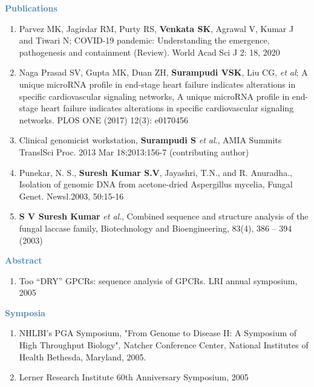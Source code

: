 \documentclass[12pt]{article}
\begin{document}
\noindent\textbf{\textcolor{steelblue}{Publications}}\\[-20pt]

\begin{enumerate}
	\item Parvez MK, Jagirdar RM, Purty RS, \textbf{Venkata SK}, Agrawal V, Kumar J and Tiwari N; COVID-19 pandemic: Understanding the emergence, pathogenesis and containment (Review). World Acad Sci J 2: 18, 2020
	\item Naga Prasad SV, Gupta MK, Duan ZH, \textbf{Surampudi VSK}, Liu CG, \textit{et al}; A unique microRNA profile in end-stage heart failure indicates alterations in specific cardiovascular signaling networks, A unique microRNA profile in end-stage heart failure indicates alterations in specific cardiovascular signaling networks. PLOS ONE (2017) 12(3): e0170456
	\item Clinical genomicist workstation, \textbf{Surampudi S} \textit{et al}., AMIA Summits TranslSci Proc. 2013 Mar 18;2013:156-7 (contributing author)
	\item Punekar, N. S., \textbf{Suresh Kumar S.V}, Jayashri, T.N., and R. Anuradha., Isolation of genomic DNA from acetone-dried Aspergillus mycelia, Fungal Genet. Newsl.2003, 50:15-16
	\item \textbf{S V Suresh Kumar} \textit{et al}., Combined sequence and structure analysis of the fungal laccase family, Biotechnology and Bioengineering, 83(4), 386 – 394 (2003)
\end{enumerate}

\noindent\textbf{\textcolor{steelblue}{Abstract}}\\[-20pt]

\begin{enumerate}
	\item Too “DRY” GPCRs: sequence analysis of GPCRs. LRI annual symposium, 2005
\end{enumerate}

\noindent\textbf{\textcolor{steelblue}{Symposia}}\\[-20pt]

\begin{enumerate}
	\item NHLBI's PGA Symposium, "From Genome to Disease II: A Symposium of High Throughput Biology", Natcher Conference Center, National Institutes of Health Bethesda, Maryland, 2005.
	\item Lerner Research Institute 60th Anniversary Symposium, 2005
\end{enumerate}
\end{document}
